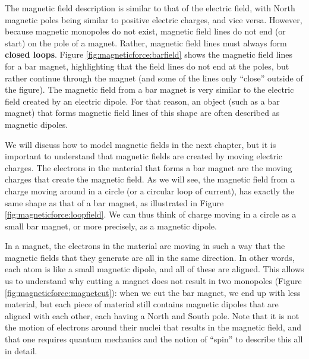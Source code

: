The magnetic field description is similar to that of the electric field, with North magnetic poles being similar to positive electric charges, and vice versa.  However, because magnetic monopoles do not exist, magnetic field lines do not end (or start) on the pole of a magnet. Rather, magnetic field lines must always form \textbf{closed loops}. Figure \ref{fig:magneticforce:barfield} shows the magnetic field lines for a bar magnet, highlighting that the field lines do not end at the poles, but rather continue through the magnet (and some of the lines only ``close'' outside of the figure). The magnetic field from a bar magnet is very similar to the electric field created by an electric dipole. For that reason, an object (such as a bar magnet) that forms magnetic field lines of this shape are often described as magnetic dipoles. 



We will discuss how to model magnetic fields in the next chapter, but it is important to understand that magnetic fields are created by moving electric charges. The electrons in the material that forms a bar magnet are the moving charges that create the magnetic field. As we will see, the magnetic field from a charge moving around in a circle (or a circular loop of current), has exactly the same shape as that of a bar magnet, as illustrated in Figure \ref{fig:magneticforce:loopfield}. We can thus think of charge moving in a circle as a small bar magnet, or more precisely, as a magnetic dipole.


In a magnet, the electrons in the material are moving in such a way that the magnetic fields that they generate are all in the same direction. In other words, each atom is like a small magnetic dipole, and all of these are aligned. This allows us to understand why cutting a magnet does not result in two monopoles (Figure \ref{fig:magneticforce:magnetcut}): when we cut the bar magnet, we end up with less material, but each piece of material still contains magnetic dipoles that are aligned with each other, each having a North and South pole. Note that it is not the motion of electrons around their nuclei that results in the magnetic field, and that one  requires quantum mechanics and the notion of ``spin'' to describe this all in detail. 
 

